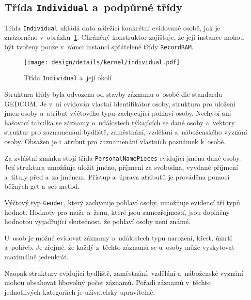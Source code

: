 		\subsection*{Třída \texttt{Individual} a~podpůrné třídy}
		Třída \texttt{Individual} ukládá data náležící konkrétní evidované osobě, jak je znázorněno v~obrázku~\ref{fig:designDetailIndividual}. Chráněný konstruktor zajišťuje, že její instance mohou být tvořeny pouze v~rámci instancí spřátelené třídy \texttt{RecordRAM}. \par
		\begin{figure}[h]
			\centering
			\texttt{[image: design/details/kernel/individual.pdf]}
			\caption{Třída \texttt{Individual} a~její okolí}
			\label{fig:designDetailIndividual}
		\end{figure}
		Struktura třídy byla odvozena od stavby záznamu o~osobě dle standardu GEDCOM. Je v~ní evidován vlastní identifikátor osoby, struktura pro uložení jmen osoby a~atribut výčtového typu zachycující pohlaví osoby. Nechybí ani hašovací tabulka se záznamy o~událostech týkajících se dané osoby a~vektory struktur pro zaznamenání bydliště, zaměstnání, vzdělání a~náboženského vyznání osoby. Obsažen je i~atribut pro zaznamenání vlastních poznámek k~osobě. \par
		Za zvláštní zmínku stojí třída \texttt{PersonalNamePieces} evidující jména dané osoby. Její struktura umožňuje uložit jméno, příjmení za svobodna, vyvdané příjmení a~tituly před a~za jménem. Přístup a~úprava atributů je prováděna pomocí běžných get a~set metod. \par
		Výčtový typ \texttt{Gender}, který zachycuje pohlaví osoby, umožňuje evidencí tří typů hodnot. Hodnoty pro muže a~ženu, které jsou samozřejmostí, jsou doplněny hodnotou vyjadřující skutečnost, že pohlaví osoby není známé. \par
		U~osob je možné evidovat záznamy o~událostech typu narození, křest, úmrtí a~pohřeb. Je zřejmé, že každý z~těchto záznamů se u~osoby může vyskytovat maximálně jedenkrát.\par
		Naopak struktury evidující bydliště, zaměstnání, vzdělání a~náboženské vyznání mohou obsahovat libovolný počet záznamů. Pořadí záznamů v~těchto jednotlivých kategoriích je uživatelsky upravitelné.\par
				
